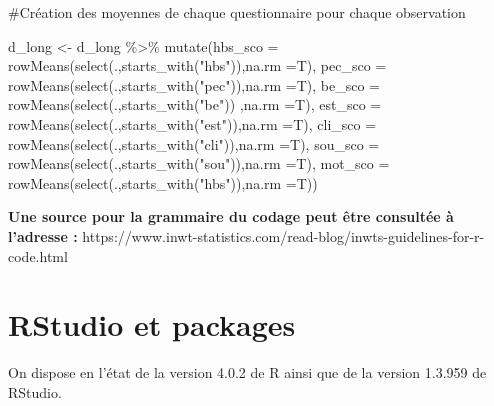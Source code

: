 \documentclass[
  letterpaper,
  DIV=11,
  numbers=noendperiod]{scrreprt}
\newenvironment{Shaded}{\begin{snugshade}}{\end{snugshade}}
\newcommand{\AttributeTok}[1]{\textcolor[rgb]{0.40,0.45,0.13}{#1}}
\newcommand{\CommentTok}[1]{\textcolor[rgb]{0.37,0.37,0.37}{#1}}
\newcommand{\FunctionTok}[1]{\textcolor[rgb]{0.28,0.35,0.67}{#1}}
\newcommand{\NormalTok}[1]{\textcolor[rgb]{0.00,0.23,0.31}{#1}}
\newcommand{\OtherTok}[1]{\textcolor[rgb]{0.00,0.23,0.31}{#1}}
\newcommand{\SpecialCharTok}[1]{\textcolor[rgb]{0.37,0.37,0.37}{#1}}
\newcommand{\StringTok}[1]{\textcolor[rgb]{0.13,0.47,0.30}{#1}}
\begin{document}
\begin{Shaded}
\begin{Highlighting}[]
\CommentTok{\#Création des moyennes de chaque questionnaire pour chaque observation}

\NormalTok{d\_long }\OtherTok{\textless{}{-}}\NormalTok{ d\_long }\SpecialCharTok{\%\textgreater{}\%} 
  \FunctionTok{mutate}\NormalTok{(}\AttributeTok{hbs\_sco =} \FunctionTok{rowMeans}\NormalTok{(}\FunctionTok{select}\NormalTok{(.,}\FunctionTok{starts\_with}\NormalTok{(}\StringTok{"hbs"}\NormalTok{)),}\AttributeTok{na.rm =}\NormalTok{T),}
         \AttributeTok{pec\_sco =} \FunctionTok{rowMeans}\NormalTok{(}\FunctionTok{select}\NormalTok{(.,}\FunctionTok{starts\_with}\NormalTok{(}\StringTok{"pec"}\NormalTok{)),}\AttributeTok{na.rm =}\NormalTok{T),}
         \AttributeTok{be\_sco  =} \FunctionTok{rowMeans}\NormalTok{(}\FunctionTok{select}\NormalTok{(.,}\FunctionTok{starts\_with}\NormalTok{(}\StringTok{"be"}\NormalTok{)) ,}\AttributeTok{na.rm =}\NormalTok{T),}
         \AttributeTok{est\_sco =} \FunctionTok{rowMeans}\NormalTok{(}\FunctionTok{select}\NormalTok{(.,}\FunctionTok{starts\_with}\NormalTok{(}\StringTok{"est"}\NormalTok{)),}\AttributeTok{na.rm =}\NormalTok{T),}
         \AttributeTok{cli\_sco =} \FunctionTok{rowMeans}\NormalTok{(}\FunctionTok{select}\NormalTok{(.,}\FunctionTok{starts\_with}\NormalTok{(}\StringTok{"cli"}\NormalTok{)),}\AttributeTok{na.rm =}\NormalTok{T),}
         \AttributeTok{sou\_sco =} \FunctionTok{rowMeans}\NormalTok{(}\FunctionTok{select}\NormalTok{(.,}\FunctionTok{starts\_with}\NormalTok{(}\StringTok{"sou"}\NormalTok{)),}\AttributeTok{na.rm =}\NormalTok{T),}
         \AttributeTok{mot\_sco =} \FunctionTok{rowMeans}\NormalTok{(}\FunctionTok{select}\NormalTok{(.,}\FunctionTok{starts\_with}\NormalTok{(}\StringTok{"hbs"}\NormalTok{)),}\AttributeTok{na.rm =}\NormalTok{T))}
\end{Highlighting}
\end{Shaded}

\textbf{Une source pour la grammaire du codage peut être consultée à
l'adresse :}
https://www.inwt-statistics.com/read-blog/inwts-guidelines-for-r-code.html

\hypertarget{rstudio-et-packages}{%
\section{RStudio et packages}\label{rstudio-et-packages}}

On dispose en l'état de la version 4.0.2 de R ainsi que de la version
1.3.959 de RStudio.
\end{document}
